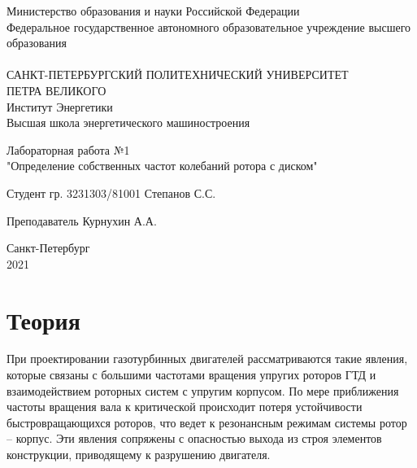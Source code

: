 



\begin{titlepage}

\begin{center}
Министерство образования и науки Российской Федерации\\
Федеральное государственное автономного образовательное учреждение высшего образования\\
\hrulefill\\
\vspace{0.5cm}
САНКТ-ПЕТЕРБУРГСКИЙ ПОЛИТЕХНИЧЕСКИЙ УНИВЕРСИТЕТ\\ ПЕТРА ВЕЛИКОГО\\
\vspace{0.5cm}
Институт Энергетики\\
Высшая школа энергетического машиностроения\\

\end{center}

\vspace{5cm}
\begin{center}
\begin{large}
Лабораторная работа №1 \\
"Определение собственных частот колебаний ротора с диском"
\end{large}
\end{center}

\vspace{5cm}
\hspace{5cm} Студент гр. 3231303/81001 \hrulefill Степанов С.С.


\vspace{0.5cm}
\hspace{5cm} Преподаватель \hrulefill Курнухин А.А. \\


\vfill
\begin{center}
Санкт-Петербург\\
2021
\end{center}

\end{titlepage}

\tableofcontents
\newpage

\section{Теория}
При проектировании газотурбинных двигателей рассматриваются такие явления, которые связаны с большими частотами вращения упругих роторов ГТД и взаимодействием роторных систем с упругим корпусом. По мере приближения частоты вращения вала к критической происходит потеря устойчивости быстровращающихся роторов, что ведет к резонансным режимам системы ротор – корпус. Эти явления сопряжены с опасностью выхода из строя элементов конструкции, приводящему к разрушению двигателя.\\

